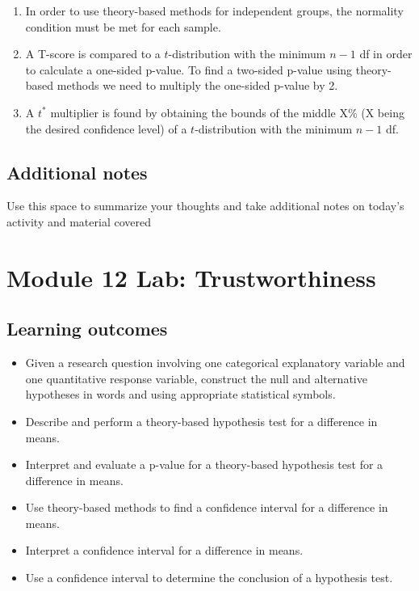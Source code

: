 \documentclass[
]{report}
\begin{document}
\begin{enumerate}
\def\labelenumi{\arabic{enumi}.}
\item
  In order to use theory-based methods for independent groups, the normality condition must be met for each sample.
\item
  A T-score is compared to a \(t\)-distribution with the minimum \(n - 1\) df in order to calculate a one-sided p-value. To find a two-sided p-value using theory-based methods we need to multiply the one-sided p-value by 2.
\item
  A \(t^*\) multiplier is found by obtaining the bounds of the middle X\% (X being the desired confidence level) of a \(t\)-distribution with the minimum \(n - 1\) df.
\end{enumerate}

\subsection{Additional notes}\label{additional-notes-23}

Use this space to summarize your thoughts and take additional notes on today's activity and material covered

\vspace{3in}
\newpage

\section{Module 12 Lab: Trustworthiness}\label{module-12-lab-trustworthiness}


\subsection{Learning outcomes}\label{learning-outcomes-29}

\begin{itemize}
\item
  Given a research question involving one categorical explanatory variable and one quantitative response variable, construct the null and alternative hypotheses
  in words and using appropriate statistical symbols.
\item
  Describe and perform a theory-based hypothesis test for a difference in means.
\item
  Interpret and evaluate a p-value for a theory-based hypothesis test for a difference in means.
\item
  Use theory-based methods to find a confidence interval for a difference in means.
\item
  Interpret a confidence interval for a difference in means.
\item
  Use a confidence interval to determine the conclusion of a hypothesis test.
\end{itemize}
\end{document}
